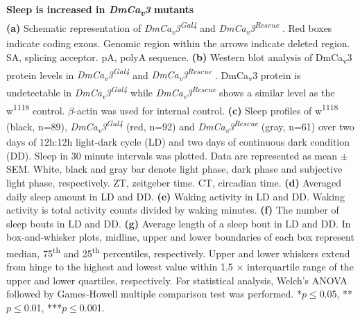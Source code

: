 \label{fig:3}
\textbf{Sleep is increased in \emph{DmCa\textsubscript{v}3} mutants}
\\
\textbf{(a)} Schematic representation of \emph{DmCa\textsubscript{v}3\textsuperscript{Gal4}} and \emph{DmCa\textsubscript{v}3\textsuperscript{Rescue}} . 
Red boxes indicate coding exons.
Genomic region within the arrows indicate deleted region.
SA, splicing acceptor. pA, polyA sequence.  
\textbf{(b)} Western blot analysis of DmCa\textsubscript{v}3 protein levels in \emph{DmCa\textsubscript{v}3\textsuperscript{Gal4}} and \emph{DmCa\textsubscript{v}3\textsuperscript{Rescue}} .
DmCa\textsubscript{v}3 protein is undetectable in \emph{DmCa\textsubscript{v}3\textsuperscript{Gal4}} while \emph{DmCa\textsubscript{v}3\textsuperscript{Rescue}}  shows a similar level as the w\textsuperscript{1118} control.
$\beta$-actin was used for internal control.
\textbf{(c)} Sleep profiles of w\textsuperscript{1118} (black, n=89), \emph{DmCa\textsubscript{v}3\textsuperscript{Gal4}} (red, n=92) and \emph{DmCa\textsubscript{v}3\textsuperscript{Rescue}}  (gray, n=61) over two days of 12h:12h light-dark cycle (LD) and two days of continuous dark condition (DD).
Sleep in 30 minute intervals was plotted.
Data are represented as mean $\pm$ SEM.
White, black and gray bar denote light phase, dark phase and subjective light phase, respectively.
ZT, zeitgeber time.
CT, circadian time.
\textbf{(d)} Averaged daily sleep amount in LD and DD.
\textbf{(e)} Waking activity in LD and DD.
Waking activity is total activity counts divided by waking minutes.
\textbf{(f)} The number of sleep bouts in LD and DD.
\textbf{(g)} Average length of a sleep bout in LD and DD.
In box-and-whisker plots, midline, upper and lower boundaries of each box represent median, 75\textsuperscript{th} and 25\textsuperscript{th} percentiles, respectively.
Upper and lower whiskers extend from hinge to the highest and lowest value within 1.5 $\times$ interquartile range of the upper and lower quartiles, respectively.
For statistical analysis, Welch's ANOVA followed by Games-Howell multiple comparison test was performed.
*$p\le$0.05, **$p\le$0.01, ***$p\le$0.001.
  
  
  
  
  